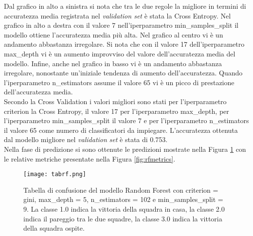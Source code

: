 Dal grafico in alto a sinistra si nota che tra le due regole la migliore in termini di accuratezza media registrata nel \emph{validation set} è stata la Cross Entropy. Nel grafico in alto a destra con il valore 7 nell'iperparametro \textsf{min\_samples\_split} il modello ottiene l'accuratezza media più alta. Nel grafico al centro vi è un andamento abbastanza irregolare. Si nota che con il valore 17 dell'iperparametro \textsf{max\_depth} vi è un aumento improvviso del valore dell'accuratezza media del modello. Infine, anche nel grafico in basso vi è un andamento abbastanza irregolare, nonostante un'iniziale tendenza di aumento dell'accuratezza. Quando l'iperparametro \textsf{n\_estimators} assume il valore 65 vi è un picco di prestazione dell'accuratezza media.\\
Secondo la Cross Validation i valori migliori sono stati per l'iperparametro \textsf{criterion} la Cross Entropy, il valore 17 per l'iperparametro \textsf{max\_depth}, per l'iperparametro \textsf{min\_samples\_split} il valore 7 e per l'iperparametro \textsf{n\_estimators} il valore 65 come numero di classificatori da impiegare.
L'accuratezza ottenuta dal modello migliore nel \emph{validation} \emph{set} è stata di 0.753.\\
Nella fase di predizione si sono ottenute le predizioni mostrate nella Figura \ref{fig:tabrf} con le relative metriche presentate nella Figura \ref{fig:rfmetrics}.
\begin{figure}[h]
	\begin{center}
		\texttt{[image: tabrf.png]}
		\caption{Tabella di confusione del modello Random Forest con \textsf{criterion} = gini, \textsf{max\_depth} = 5, \textsf{n\_estimators} = 102 e \textsf{min\_samples\_split} = 9. La classe 1.0 indica la vittoria della squadra in casa, la classe 2.0 indica il pareggio tra le due squadre, la classe 3.0 indica la vittoria della squadra ospite.
		} 
		\label{fig:tabrf}
	\end{center}
\end{figure}

